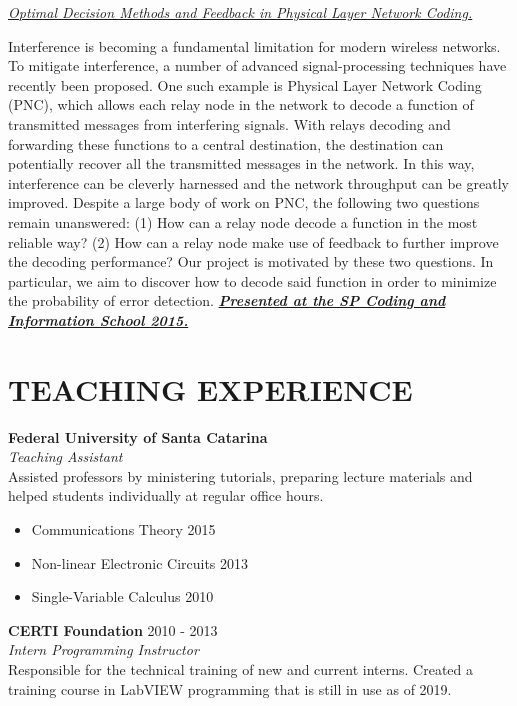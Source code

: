 \documentclass[margin, line]{res}
\begin{document}
\begin{resume}
\underline{\sl Optimal Decision Methods and Feedback in Physical Layer Network Coding.}\\
\begin{small}
    Interference is becoming a fundamental limitation for modern wireless networks. To mitigate interference, a number of advanced signal-processing techniques have recently been proposed. One such example is Physical Layer Network Coding (PNC), which allows each relay node in the network to decode a function of transmitted messages from interfering signals. With relays decoding and forwarding these functions to a central destination, the destination can potentially recover all the transmitted messages in the network. In this way, interference can be cleverly harnessed and the network throughput can be greatly improved. Despite a large body of work on PNC, the following two questions remain unanswered: (1) How can a relay node decode a function in the most reliable way? (2) How can a relay node make use of feedback to further improve the decoding performance? Our project is motivated by these two questions. In particular, we aim to discover how to decode said function in order to minimize the probability of error detection. \href{https://www.ime.unicamp.br/spcodingschool/}{\sl \textbf{Presented at the SP Coding and Information School 2015.}}
\end{small}
\newpage
\section{TEACHING EXPERIENCE}
\textbf{Federal University of Santa Catarina}\\
{\sl Teaching Assistant}\\
Assisted professors by ministering tutorials, preparing lecture materials and helped students individually at regular office hours.

\begin{itemize}
    \item Communications Theory \hfill 2015
    \item Non-linear Electronic Circuits \hfill 2013
    \item Single-Variable Calculus \hfill 2010
\end{itemize}

\textbf{CERTI Foundation} \hfill 2010 - 2013\\
{\sl Intern Programming Instructor}\\
Responsible for the technical training of new and current interns. Created a training course in LabVIEW programming that is still in use as of 2019.


\end{resume}
\end{document}
